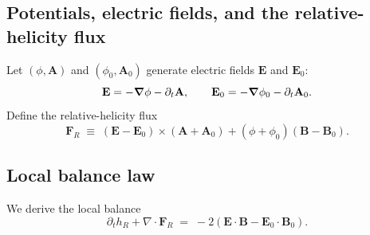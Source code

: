 \documentclass[11pt]{article}
\theoremstyle{plain}
\theoremstyle{definition}
\theoremstyle{remark}
\newcommand{\diver}{\nabla\cdot}
\newcommand{\A}{\mathbf{A}}
\newcommand{\B}{\mathbf{B}}
\newcommand{\E}{\mathbf{E}}
\begin{document}
\subsection{Potentials, electric fields, and the relative-helicity flux}
Let $(\phi,\A)$ and $(\phi_0,\A_0)$ generate electric fields $\E$ and $\E_0$:
\begin{equation}\label{eq:app_rel_E}
  \E = -\grad\phi - \partial_t\A,
  \qquad
  \E_0 = -\grad\phi_0 - \partial_t\A_0.
\end{equation}
Define the relative-helicity flux
\begin{equation}\label{eq:app_rel_flux}
  \mathbf{F}_R
  \;\equiv\;
  (\E-\E_0)\times(\A+\A_0) + (\phi+\phi_0)(\B-\B_0).
\end{equation}

\subsection{Local balance law}
We derive the local balance
\begin{equation}\label{eq:app_rel_local_target}
  \partial_t h_R + \diver\mathbf{F}_R
  \;=\;
  -2\left(\E\cdot\B - \E_0\cdot\B_0\right).
\end{equation}
\end{document}
